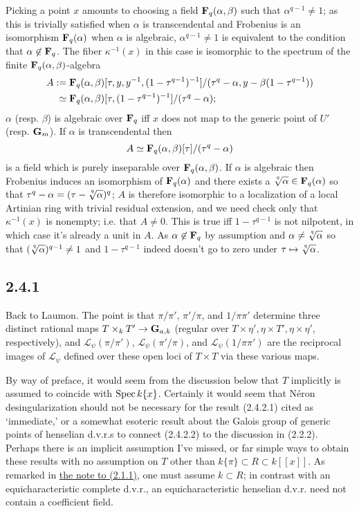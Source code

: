 \documentclass[deligne.tex]{subfiles}
\begin{document}
Picking a point $x$ amounts to choosing a field
$\mathbf{F}_q(\alpha,\beta)$ such that $\alpha^{q-1}\ne1$;
as this is trivially satisfied when $\alpha$ is transcendental and
Frobenius is an isomorphism $\mathbf{F}_q(\alpha)$ when $\alpha$ is algebraic,
$\alpha^{q-1}\ne1$ is equivalent to the condition that $\alpha\not\in\mathbf{F}_q$.
The fiber $\kappa^{-1}(x)$ in this case is isomorphic to the spectrum of 
the finite $\mathbf{F}_q(\alpha,\beta)$-algebra
\begin{align*}
	A:=\;&\mathbf{F}_q(\alpha,\beta)[\tau,y,y^{-1},(1-\tau^{q-1})^{-1}]/(\tau^q-\alpha,y-\beta(1-\tau^{q-1})) \\
	\simeq\; &\mathbf{F}_q(\alpha,\beta)[\tau,(1-\tau^{q-1})^{-1}]/(\tau^q-\alpha);
\end{align*}
$\alpha$ (resp. $\beta$) is algebraic over $\mathbf{F}_q$ iff $x$ does not
map to the generic point of $U'$ (resp. $\mathbf{G}_m$).
If $\alpha$ is transcendental then
\begin{equation*}
	A\simeq\mathbf{F}_q(\alpha,\beta)[\tau]/(\tau^q-\alpha)
\end{equation*}
is a field which is purely inseparable over $\mathbf{F}_q(\alpha,\beta)$.
If $\alpha$ is algebraic then Frobenius induces an isomorphism
of $\mathbf{F}_q(\alpha)$ and there exists a
$\sqrt[\uproot{4}q]\alpha\in\FF_q(\alpha)$ so that
$\tau^q-\alpha=(\tau-\sqrt[\uproot{4}q]\alpha)^q$;
$A$ is therefore isomorphic to a localization of a local Artinian ring with
trivial residual extension, and we need check only that $\kappa^{-1}(x)$
is nonempty; i.e. that $A\ne0$.
This is true iff $1-\tau^{q-1}$ is not nilpotent, in which case it's 
already a unit in $A$. As $\alpha\not\in\mathbf{F}_q$ by assumption and
$\alpha\ne \sqrt[\uproot{4}q]\alpha$ so that
$(\sqrt[\uproot{4}q]\alpha)^{q-1}\ne1$ and $1-\tau^{q-1}$ indeed
doesn't go to zero under $\tau\mapsto\sqrt[\uproot{4}q]\alpha$.

\subsection*{2.4.1}\label{laumon:2.4.1} Back to Laumon.
The point is that $\pi/\pi'$, $\pi'/\pi$, and $1/\pi\pi'$
determine three distinct rational maps $T\times_kT'\rightarrow\mathbf{G}_{a,k}$
(regular over $T\times\eta',\eta\times T',\eta\times\eta'$, respectively), 
and $\mathscr L_\psi(\pi/\pi')$, $\mathscr L_\psi(\pi'/\pi)$, and
$\mathscr L_\psi(1/\pi\pi')$ are the reciprocal images of $\mathscr L_\psi$
defined over these open loci of $T\times T$ via these various maps.

By way of preface, it would seem from the discussion below that $T$
implicitly is assumed to coincide with $\operatorname{Spec} k\{x\}$.
Certainly it would seem that Néron desingularization should not be 
necessary for the result (2.4.2.1) cited as `immediate,' or a somewhat
esoteric result about the Galois group of generic points of henselian 
d.v.r.s to connect (2.4.2.2) to the discussion in (2.2.2).
Perhaps there is an implicit assumption I've missed, or far simple ways to
obtain these results with no assumption on $T$ other than
$k\{\pi\}\subset R\subset k[[x]]$.
As remarked in \hyperref[laumon:2.1.1]{the note to (2.1.1)}, one must
assume $k\subset R$; in contrast with an equicharacteristic complete 
d.v.r., an equicharacteristic henselian d.v.r. need not contain a
coefficient field.
\end{document}
